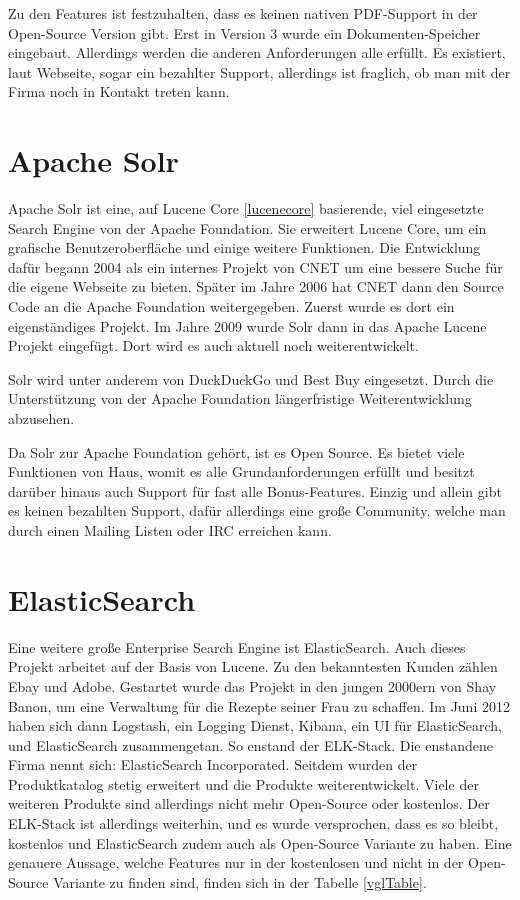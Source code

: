 Zu den Features ist festzuhalten, dass es keinen nativen PDF-Support in der Open-Source Version gibt. Erst in Version 3 wurde ein Dokumenten-Speicher eingebaut. Allerdings werden die anderen Anforderungen alle erfüllt. Es existiert, laut Webseite, sogar ein bezahlter Support, allerdings ist fraglich, ob man mit der Firma noch in Kontakt treten kann. \cite{SphinxTechnologiesInc.2019}

\section{Apache Solr}
\label{solr}

Apache Solr ist eine, auf Lucene Core \ref{lucenecore} basierende, viel eingesetzte Search Engine von der Apache Foundation. Sie erweitert Lucene Core, um ein grafische Benutzeroberfläche und einige weitere Funktionen. 
Die Entwicklung dafür begann 2004 als ein internes Projekt von CNET um eine bessere Suche für die eigene Webseite zu bieten. Später im Jahre 2006 hat CNET dann den Source Code an die Apache Foundation weitergegeben. Zuerst wurde es dort ein eigenständiges Projekt. Im Jahre 2009 wurde Solr dann in das Apache Lucene Projekt eingefügt. Dort wird es auch aktuell noch weiterentwickelt. \cite{Wikipedia.2019b}

Solr wird unter anderem von DuckDuckGo und Best Buy eingesetzt. Durch die Unterstützung von der Apache Foundation längerfristige Weiterentwicklung abzusehen. 

Da Solr zur Apache Foundation gehört, ist es Open Source. Es bietet viele Funktionen von Haus, womit es alle Grundanforderungen erfüllt und besitzt darüber hinaus auch Support für fast alle Bonus-Features. Einzig und allein gibt es keinen bezahlten Support, dafür allerdings eine große Community, welche man durch einen Mailing Listen oder IRC erreichen kann. \cite{TheApacheSoftwareFoundation.2019}

\section{ElasticSearch}
\label{elasticsearch}

Eine weitere große Enterprise Search Engine ist ElasticSearch. Auch dieses Projekt arbeitet auf der Basis von Lucene. Zu den bekanntesten Kunden zählen Ebay und Adobe. Gestartet wurde das Projekt in den jungen 2000ern von Shay Banon, um eine Verwaltung für die Rezepte seiner Frau zu schaffen. Im Juni 2012 haben sich dann Logstash, ein Logging Dienst, Kibana, ein UI für ElasticSearch, und ElasticSearch zusammengetan. So enstand der ELK-Stack. Die enstandene Firma nennt sich: ElasticSearch Incorporated. Seitdem wurden der Produktkatalog stetig erweitert und die Produkte weiterentwickelt. Viele der weiteren Produkte sind allerdings nicht mehr Open-Source oder kostenlos. Der ELK-Stack ist allerdings weiterhin, und es wurde versprochen, dass es so bleibt, kostenlos und ElasticSearch zudem auch als Open-Source Variante zu haben. Eine genauere Aussage, welche Features nur in der kostenlosen und nicht in der Open-Source Variante zu finden sind, finden sich in der Tabelle \ref{vglTable}.

